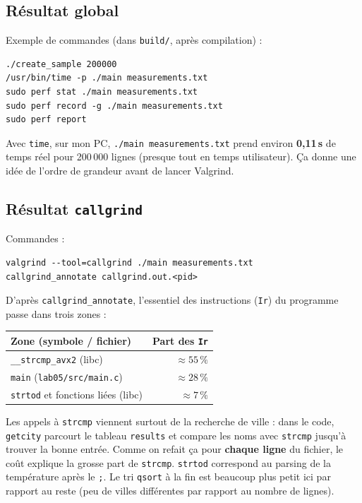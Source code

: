 \documentclass[a4paper,12pt]{article}
\begin{document}
\subsection{Résultat global}
Exemple de commandes (dans \texttt{build/}, après compilation) :
\begin{verbatim}
./create_sample 200000
/usr/bin/time -p ./main measurements.txt
sudo perf stat ./main measurements.txt
sudo perf record -g ./main measurements.txt
sudo perf report
\end{verbatim}
Avec \texttt{time}, sur mon PC, \texttt{./main measurements.txt} prend environ \textbf{0{,}11\,s} de temps réel pour 200\,000 lignes (presque tout en temps utilisateur). Ça donne une idée de l'ordre de grandeur avant de lancer Valgrind.

\subsection{Résultat \texttt{callgrind}}
Commandes :
\begin{verbatim}
valgrind --tool=callgrind ./main measurements.txt
callgrind_annotate callgrind.out.<pid>
\end{verbatim}

D'après \texttt{callgrind\_annotate}, l'essentiel des instructions (\texttt{Ir}) du programme passe dans trois zones :
\begin{center}
\begin{tabular}{|l|r|}
\hline
Zone (symbole / fichier) & Part des \texttt{Ir} \\
\hline
\texttt{\_\_strcmp\_avx2} (libc) & $\approx 55\,\%$ \\
\texttt{main} (\texttt{lab05/src/main.c}) & $\approx 28\,\%$ \\
\texttt{strtod} et fonctions liées (libc) & $\approx 7\,\%$ \\
\hline
\end{tabular}
\end{center}

Les appels à \texttt{strcmp} viennent surtout de la recherche de ville : dans le code, \texttt{getcity} parcourt le tableau \texttt{results} et compare les noms avec \texttt{strcmp} jusqu'à trouver la bonne entrée. Comme on refait ça pour \textbf{chaque ligne} du fichier, le coût explique la grosse part de \texttt{strcmp}. \texttt{strtod} correspond au parsing de la température après le \texttt{;}. Le tri \texttt{qsort} à la fin est beaucoup plus petit ici par rapport au reste (peu de villes différentes par rapport au nombre de lignes).
\end{document}
